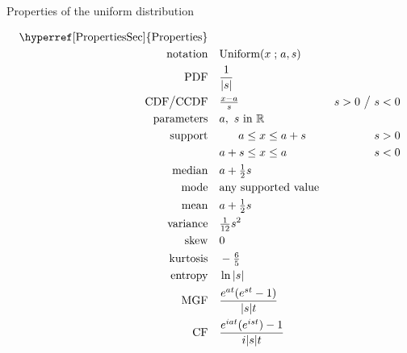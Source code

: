 

\begin{table*}[t!]
\caption[Uniform distribution -- Properties]{Properties of the uniform distribution}
\begin{align*}
\text{\hyperref[PropertiesSec]{Properties}}  \quad& \\
\text{notation} \quad & \text{Uniform}(x \given a,s) 				\checked
\\
\text{PDF} \quad & \frac{1}{|s|}								\checked
\\
\text{CDF} \big/ \text{CCDF} \quad  &  \tfrac{x-a}{s} & s>0 \ \big/ \   s<0 
\\
\text{parameters} \quad & a,\ s \text{ in }  \mathbb{R}			\checked
\\
\text{support} \quad &  \phantom{s+{}} a \leq x \leq a+s      & s>0					\checked
\\
				&    a+s \leq x \leq a    & s<0					\checked
\\
\text{median} \quad  & a + \half s							\checked
\\
\text{mode} \quad  & \text{any supported value }				\checked
\\
\text{mean} \quad  & a + \half s								\checked
\\
\text{variance} \quad  & \sfrac{1}{12}s^2						\checked
\\
\text{skew} \quad  & 0									\checked
\\
\text{kurtosis} \quad  & -\tfrac{6}{5}							\checked
\\
\text{entropy} \quad  & \ln |s|  								\checked
\\
\text{MGF} \quad  &  \frac{e^{at}( e^{st}- 1 ) }{ |s| t}				%
\\
\text{CF} \quad  & \frac{e^{iat} (e^{i st})-1 }{ i |s| t}				%
\end{align*}

\end{table*}
